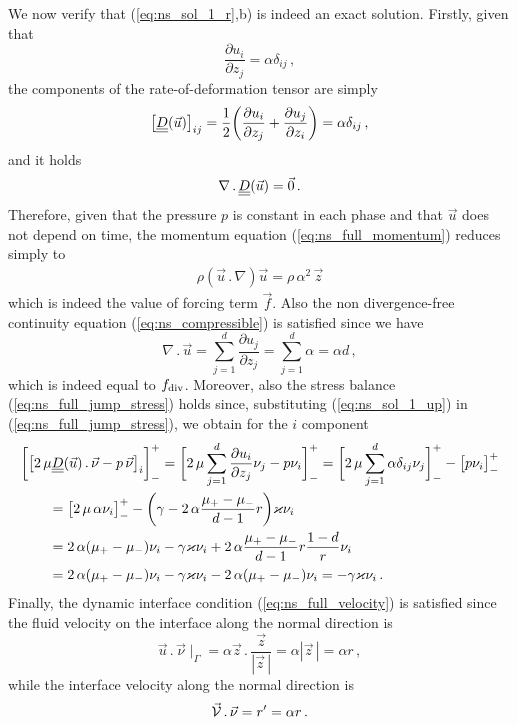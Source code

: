 We now verify that (\ref{eq:ns_sol_1_r},b) is indeed an exact solution. Firstly,
given that
\begin{equation*}
\frac{\partial u_i}{\partial z_j}=\alpha\delta_{ij}\,,
\end{equation*}
the components of the rate-of-deformation tensor are simply
\begin{equation*}
\big[\mat D(\vec u) \big]_{ij} = \frac{1}{2}\bigg(\frac{\partial
u_i}{\partial z_j} + \frac{\partial u_j}{\partial
z_i}\bigg)=\alpha\delta_{ij}\,,
\end{equation*}
and it holds
\begin{align*}
\nabla\,.\,\mat D(\vec u) = \vec 0\,.
\end{align*}
Therefore, given that the pressure $p$ is constant in each phase and that
$\vec u$ does not depend on time, the momentum equation
(\ref{eq:ns_full_momentum}) reduces simply to
\begin{align*}
\rho(\vec u \,.\, \nabla)\vec u=\rho\,\alpha^2\,\vec z
\end{align*}
which is indeed the value of forcing term $\vec f$. Also the non
divergence-free continuity equation (\ref{eq:ns_compressible}) is satisfied
since we have
\begin{equation*}
\nabla\,.\,\vec u=\sum_{j=1}^d\frac{\partial u_j}{\partial z_j} =
\sum_{j=1}^d\alpha=\alpha d \,,
\end{equation*}
which is indeed equal to $f_{\rm{div}}$.
Moreover, also the stress balance
(\ref{eq:ns_full_jump_stress}) holds since, substituting
(\ref{eq:ns_sol_1_up}) in (\ref{eq:ns_full_jump_stress}), we obtain for the
$i$ component
\begin{align*}
& \bigg[\big[2\,\mu \mat D(\vec u)\,.\,\vec\nu - p\,\vec \nu\big]_i\bigg]_-^+ =
\bigg[2\,\mu \sum_{j=1}^d\frac{\partial u_i}{\partial z_j}\nu_j -
p\nu_i\bigg]_-^+
= \bigg[2\,\mu\sum_{j=1}^d\alpha\delta_{ij}\nu_j\bigg]_-^+
-\big[p\nu_i\big]_-^+ \\
& \qquad = \big[2\,\mu\,\alpha\nu_i\big]_-^+
-\bigg(\gamma -2 \,\alpha \frac{\mu_+ - \mu_-}{d-1}r\bigg)\varkappa\nu_i \\
& \qquad = 2\,\alpha(\mu_+-\mu_-)\nu_i -\gamma \varkappa \nu_i +
2\,\alpha\frac{\mu_+ - \mu_-}{d-1}r\frac{1-d}{r}\nu_i \\
& \qquad = 2\,\alpha(\mu_+-\mu_-)\nu_i -\gamma \varkappa \nu_i -
2\,\alpha(\mu_+-\mu_-)\nu_i = -\gamma \varkappa \nu_i\,.
\end{align*}
Finally, the dynamic interface condition (\ref{eq:ns_full_velocity}) is
satisfied since the fluid velocity on the interface along the normal direction
is
\begin{equation*}
\vec u\,.\,\vec \nu \!\mid_\Gamma=\alpha\vec z\,.\, \frac{\vec z}{|\vec z\,|} =
\alpha|\vec z\,|=\alpha r\,,
\end{equation*}
while the interface velocity along the normal direction is
\begin{equation*}
\vec{\mathcal{V}}\,.\,\vec \nu=r^\prime=\alpha r\,.
\end{equation*}

